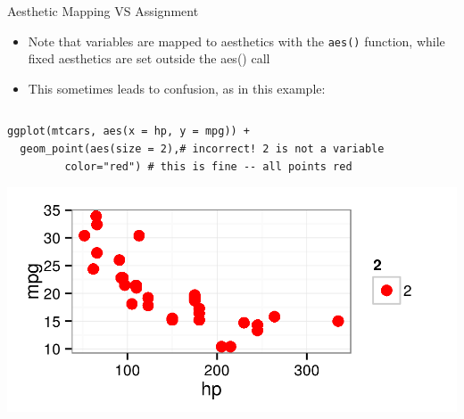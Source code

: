 \documentclass[table,smaller]{beamer}
\begin{document}
\begin{frame}[fragile,label=sec-2-7]{Aesthetic Mapping VS Assignment}
 \begin{itemize}
\item Note that variables are mapped to aesthetics with the \texttt{aes()} function, while fixed aesthetics are set outside the aes() call
\item This sometimes leads to confusion, as in this example:
\end{itemize}

\begin{columns}  \begin{block}{}

\begin{verbatim}
ggplot(mtcars, aes(x = hp, y = mpg)) +
  geom_point(aes(size = 2),# incorrect! 2 is not a variable
	     color="red") # this is fine -- all points red
\end{verbatim}

\includegraphics[width=.9\linewidth]{images/mtcars2.png}

\end{block} \end{columns}
\end{frame}
\end{document}
